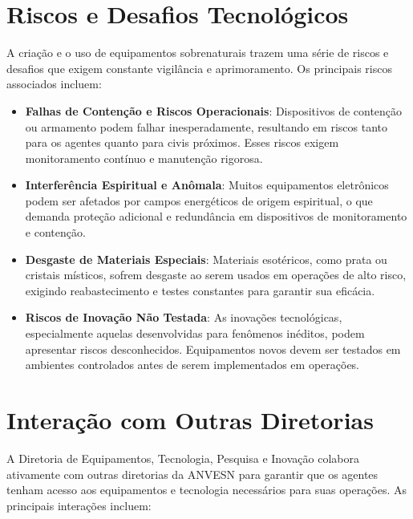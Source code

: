 \section{Riscos e Desafios Tecnológicos}
A criação e o uso de equipamentos sobrenaturais trazem uma série de riscos e desafios que exigem constante vigilância e aprimoramento. Os principais riscos associados incluem:

\begin{itemize}
    \item \textbf{Falhas de Contenção e Riscos Operacionais}: Dispositivos de contenção ou armamento podem falhar inesperadamente, resultando em riscos tanto para os agentes quanto para civis próximos. Esses riscos exigem monitoramento contínuo e manutenção rigorosa.
    \item \textbf{Interferência Espiritual e Anômala}: Muitos equipamentos eletrônicos podem ser afetados por campos energéticos de origem espiritual, o que demanda proteção adicional e redundância em dispositivos de monitoramento e contenção.
    \item \textbf{Desgaste de Materiais Especiais}: Materiais esotéricos, como prata ou cristais místicos, sofrem desgaste ao serem usados em operações de alto risco, exigindo reabastecimento e testes constantes para garantir sua eficácia.
    \item \textbf{Riscos de Inovação Não Testada}: As inovações tecnológicas, especialmente aquelas desenvolvidas para fenômenos inéditos, podem apresentar riscos desconhecidos. Equipamentos novos devem ser testados em ambientes controlados antes de serem implementados em operações.
\end{itemize}

\section{Interação com Outras Diretorias}

A Diretoria de Equipamentos, Tecnologia, Pesquisa e Inovação colabora ativamente com outras diretorias da ANVESN para garantir que os agentes tenham acesso aos equipamentos e tecnologia necessários para suas operações. As principais interações incluem:

